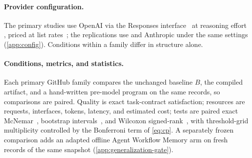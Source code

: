 \paragraph{Provider configuration.}
The primary studies use OpenAI  via the 
Responses interface~\citep{openai2026agents} at reasoning effort ,
priced at list rates~\citep{openai2026pricing}; the
replications use  and Anthropic  under
the same settings (\cref{app:config}). Conditions within a family differ in
structure alone.

\paragraph{Conditions, metrics, and statistics.}
Each primary GitHub family compares the unchanged baseline $B$, the compiled artifact,
and a hand-written pre-model program on the same records, so comparisons are
paired. Quality is exact task-contract satisfaction; resources are requests,
interfaces, tokens, latency, and estimated cost; tests are paired exact
McNemar~\citep{mcnemar1947}, bootstrap intervals~\citep{efron1993bootstrap},
and Wilcoxon signed-rank~\citep{wilcoxon1945}, with threshold-grid multiplicity
controlled by the Bonferroni term of \cref{eq:cp}. A separately frozen
comparison adds an adapted offline Agent Workflow Memory arm on fresh records
of the same snapshot (\cref{app:generalization-gate}).
